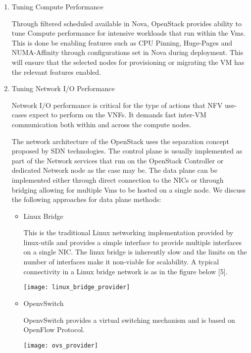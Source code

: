 \documentclass[../seminar.tex]{subfiles}
\begin{document}
	
\begin{enumerate}
\item Tuning Compute Performance
\begin{flushleft}
Through filtered scheduled available in Nova, OpenStack provides ability to tune Compute performance for intensive workloads that run within the Vms. This is done be enabling features such as CPU Pinning, Huge-Pages and NUMA-Affinity through configurations set in Nova during deployment. This will ensure that the selected nodes for provisioning or migrating the VM has the relevant features enabled. 
\end{flushleft}

\item Tuning Network I/O Performance
\begin{flushleft}
Network I/O performance is critical for the type of actions that NFV use-cases expect to perform on the VNFs. It demands fast inter-VM communication both within and across the compute nodes. 

The network architecture of the OpenStack uses the separation concept proposed by SDN technologies. The control plane is usually implemented as part of the Network services that run on the OpenStack Controller or dedicated Network node as the case may be. The data plane can be implemented either through direct connection to the NICs or through bridging allowing for multiple Vms to be hosted on a single node. We discuss the following approaches for data plane methods:
		
\begin{itemize}
\item Linux Bridge
\begin{flushleft}
This is the traditional Linux networking implementation provided by linux-utils and provides a simple interface to provide multiple interfaces on a single NIC. The linux bridge is inherently slow and the limits on the number of interfaces make it non-viable for scalability. A typical connectivity in a Linux bridge network is as in the figure below [5].
				
\texttt{[image: linux\_bridge\_provider]}
				
\end{flushleft}
\item OpenvSwitch
\begin{flushleft}
OpenvSwitch provides a virtual switching mechanism and is based on OpenFlow Protocol. 
				
\texttt{[image: ovs\_provider]}
				

\end{flushleft}
\end{itemize}
\end{flushleft}
\end{enumerate}
\end{document}
